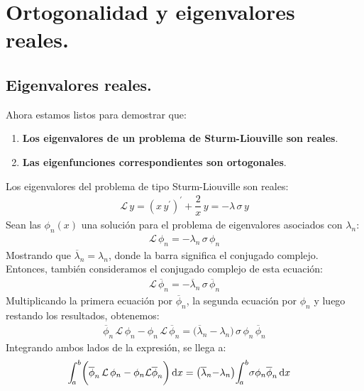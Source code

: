 \documentclass[12pt]{article}
\newcommand{\pderivada}[1]{\ensuremath{{#1}^{\prime}}}
\def\scaleint#1{\vcenter{\hbox{\scaleto[3ex]{\displaystyle\int}{#1}}}}
\def\bs{\mkern-12mu}
\numberwithin{equation}{section}
\begin{document}
\section{Ortogonalidad y eigenvalores reales.}
\subsection{Eigenvalores reales.}

Ahora estamos listos para demostrar que:
\begin{enumerate}
\item \textbf{Los eigenvalores de un problema de Sturm-Liouville son reales}.
\item \textbf{Las eigenfunciones correspondientes son ortogonales}.
\end{enumerate}

Los eigenvalores del problema de tipo Sturm-Liouville son reales:
\begin{align*}
\mathcal{L} \, y = \left( x \, \pderivada{y} \right)^{\prime} + \dfrac{2}{x} \, y = - \lambda \, \sigma \, y
\end{align*}
Sean las $\phi_{n}(x)$ una solución para el problema de eigenvalores asociados con $\lambda_{n}$:
\begin{align*}
\mathcal{L} \, \phi_{n} = - \lambda_{n} \, \sigma \, \phi_{n}
\end{align*}
Mostrando que $\overline{\lambda}_{n} = \lambda_{n}$, donde la barra significa el conjugado complejo. Entonces, también consideramos el conjugado complejo de esta ecuación:
\begin{align*}
\mathcal{L} \, \overline{\phi}_{n} = - \overline{\lambda}_{n} \, \sigma \, \overline{\phi}_{n}
\end{align*}
Multiplicando la primera ecuación por $\overline{\phi}_{n}$, la segunda ecuación por $\phi_{n}$ y luego restando los resultados, obtenemos:
\begin{align*}
\overline{\phi}_{n} \, \mathcal{L} \, \phi_{n} - \phi_{n} \, \mathcal{L} \, \overline{\phi}_{n} = \big( \overline{\lambda}_{n} - \lambda_{n} \big) \, \sigma \, \phi_{n} \, \overline{\phi}_{n}
\end{align*}
Integrando ambos lados de la expresión, se llega a:
\begin{align*}
\scaleint{5ex}_{\bs a}^{b} \bigg( \overline{\phi}_{n} \, \mathcal{L} \, \phi_{n} &- \phi_{n} \mathcal{L} \overline{\phi}_{n} \bigg) \dd{x} =\big( \overline{\lambda}_{n} {-} \lambda_{n} \big) \scaleint{5ex}_{\bs a}^{b} \sigma \phi_{n} \overline{\phi}_{n} \dd{x}
\end{align*}
\end{document}
